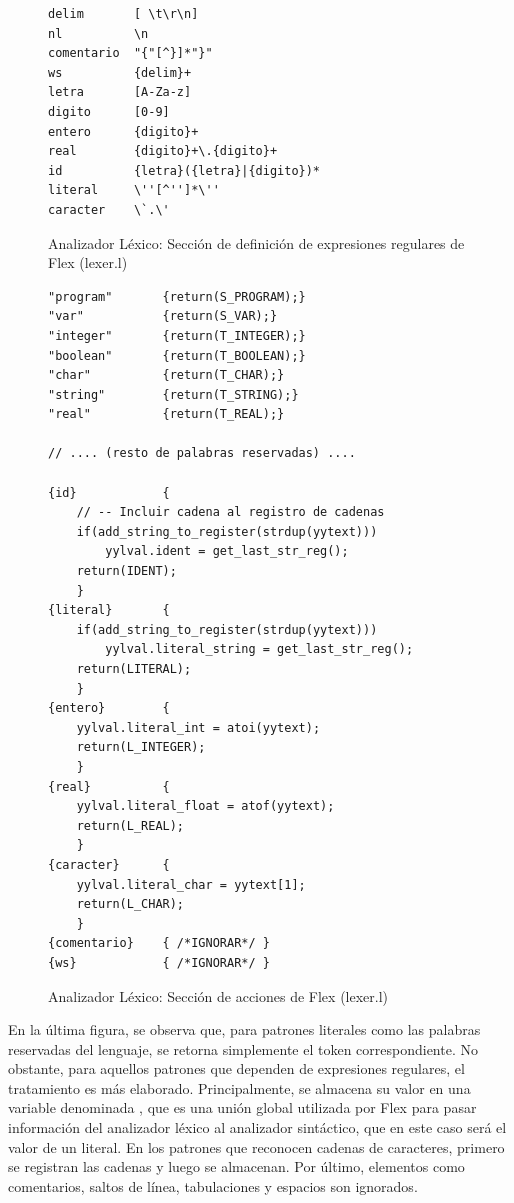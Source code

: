 \begin{figure}[ht]
\begin{lstlisting}[style=customflex]
delim       [ \t\r\n]
nl          \n
comentario  "{"[^}]*"}"
ws          {delim}+
letra       [A-Za-z]
digito      [0-9]
entero      {digito}+
real        {digito}+\.{digito}+
id          {letra}({letra}|{digito})*
literal     \''[^'']*\''
caracter    \`.\'

\end{lstlisting}
\caption{Analizador Léxico: Sección de definición de expresiones regulares de Flex (lexer.l)}
\label{fig:flexregularExpr}
\end{figure}

\newpage

\begin{figure}[htbp]
\begin{lstlisting}[style=customflex]
"program"       {return(S_PROGRAM);}
"var"           {return(S_VAR);}
"integer"       {return(T_INTEGER);}
"boolean"       {return(T_BOOLEAN);}
"char"          {return(T_CHAR);}
"string"        {return(T_STRING);}
"real"          {return(T_REAL);}

// .... (resto de palabras reservadas) ....

{id}            {
    // -- Incluir cadena al registro de cadenas
    if(add_string_to_register(strdup(yytext)))
        yylval.ident = get_last_str_reg();
    return(IDENT);
    }
{literal}       {
    if(add_string_to_register(strdup(yytext)))
        yylval.literal_string = get_last_str_reg();
    return(LITERAL);
    }
{entero}        {
    yylval.literal_int = atoi(yytext); 
    return(L_INTEGER);
    }
{real}          {
    yylval.literal_float = atof(yytext); 
    return(L_REAL);
    }
{caracter}      {
    yylval.literal_char = yytext[1]; 
    return(L_CHAR);
    }
{comentario}    { /*IGNORAR*/ }
{ws}            { /*IGNORAR*/ }
\end{lstlisting}
\caption{Analizador Léxico: Sección de acciones de Flex (lexer.l)}
\label{fig:flexAcciones}
\end{figure}

En la última figura, se observa que, para patrones literales como las palabras reservadas del lenguaje, se retorna simplemente el token correspondiente. No obstante, para aquellos patrones que dependen de expresiones regulares, el tratamiento es más elaborado. Principalmente, se almacena su valor en una variable denominada , que es una unión global utilizada por Flex para pasar información del analizador léxico al analizador sintáctico, que en este caso será el valor de un literal. En los patrones que reconocen cadenas de caracteres, primero se registran las cadenas y luego se almacenan. Por último, elementos como comentarios, saltos de línea, tabulaciones y espacios son ignorados.


